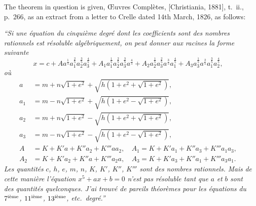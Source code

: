 \documentclass[11pt]{article}
\begin{document}
\bigskip

\noindent
The theorem in question is given, \OE{}uvres Compl\`etes, [Christiania, 1881], t.\ ii.,
p.\ 266, as an extract from a letter to Crelle dated 14th March, 1826, as follows:

\medskip

\textit{``Si une \'equation du cinqui\`eme degr\'e dont les coefficients sont des nombres
rationnels est r\'esoluble alg\'ebriquement, on peut donner aux racines la forme suivante}
\[
   x = c + A a^{\frac{1}{5}} a_1^{\frac{2}{5}} a_2^{\frac{3}{5}} a_3^{\frac{4}{5}}
       + A_1 a_1^{\frac{1}{5}} a_2^{\frac{2}{5}} a_3^{\frac{3}{5}} a^{\frac{4}{5}}
       + A_2 a_2^{\frac{1}{5}} a_3^{\frac{2}{5}} a^{\frac{3}{5}} a_1^{\frac{4}{5}}
       + A_3 a_3^{\frac{1}{5}} a^{\frac{2}{5}} a_1^{\frac{3}{5}} a_2^{\frac{4}{5}},
\]
\textit{o\`u}
\begin{align*}
   a   &= m + n\sqrt{1 + e^2} + \sqrt{h(1 + e^2 + \sqrt{1 + e^2})},\\
   a_1 &= m - n\sqrt{1 + e^2} + \sqrt{h(1 + e^2 - \sqrt{1 + e^2})},\\
   a_2 &= m + n\sqrt{1 + e^2} - \sqrt{h(1 + e^2 + \sqrt{1 + e^2})},\\
   a_3 &= m - n\sqrt{1 + e^2} - \sqrt{h(1 + e^2 - \sqrt{1 + e^2})},\\[3pt]
   A   &= K + K'a   + K''a_2 + K'''a a_2,\quad A_1 = K + K'a_1 + K''a_3 + K'''a_1 a_3,\\
   A_2 &= K + K'a_2 + K''a   + K'''a_2 a,\quad A_3 = K + K'a_3 + K''a_1 + K'''a_3 a_1.
\end{align*}
\textit{Les quantit\'es $c$, $h$, $e$, $m$, $n$, $K$, $K'$, $K''$, $K'''$ sont des nombres rationnels.
Mais de cette mani\`ere l'\'equation $x^5 + a x + b = 0$ n'est pas r\'esoluble tant que $a$ et $b$
sont des quantit\'es quelconques. J'ai trouv\'e de pareils th\'eor\`emes pour les \'equations
du $7^{\rm i\grave{e}me}$, $11^{\rm i\grave{e}me}$, $13^{\rm i\grave{e}me}$, etc.\ degr\'e.''}

\medskip
\end{document}
